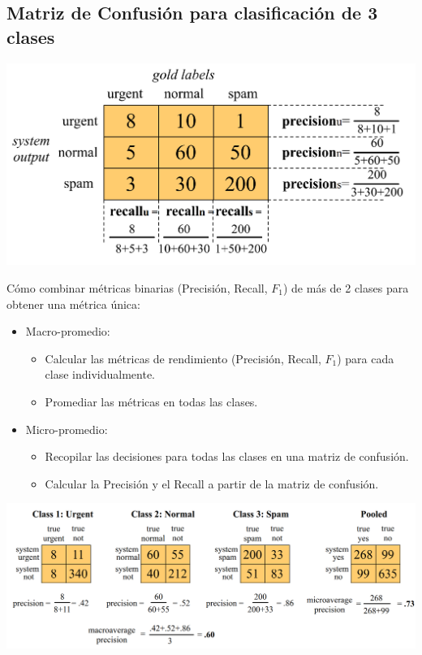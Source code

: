 \subsection{Matriz de Confusión para clasificación de 3 clases}


\begin{center}
\includegraphics[scale=0.23]{pics/confmatrix.png}
\end{center}

Cómo combinar métricas binarias (Precisión, Recall, $F_1$) de más de 2 clases para obtener una métrica única:
\begin{itemize}
 \item Macro-promedio:
 \begin{itemize}
    \item Calcular las métricas de rendimiento (Precisión, Recall, $F_1$) para cada clase individualmente.
    \item Promediar las métricas en todas las clases.
 \end{itemize}
 \item Micro-promedio:
 \begin{itemize}
    \item Recopilar las decisiones para todas las clases en una matriz de confusión.
    \item Calcular la Precisión y el Recall a partir de la matriz de confusión.
 \end{itemize}
\end{itemize}

\begin{center}
\includegraphics[scale=0.23]{pics/confmatrixmulti.png}
\end{center}
